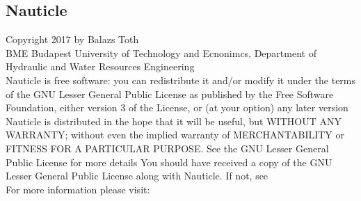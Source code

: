 \documentclass[a4paper,12pt,openany]{book}
\newcommand{\myhref}[3][nauticlegreen_dark]{\href{#2}{\color{#1}{#3}}}%
\theoremstyle{break}
\begin{document}
\subsection{Nauticle}
\noindent
Copyright \textcopyright{} 2017 by Balazs Toth \\
\noindent
BME Budapest University of Technology and Ecnonimcs, Department of Hydraulic and Water Resources Engineering\\

Nauticle is free software: you can redistribute it and/or modify it under the terms of the GNU Lesser General Public License as published by the Free Software Foundation, either version 3 of the License, or (at your option) any later version Nauticle is distributed in the hope that it will be useful, but WITHOUT ANY WARRANTY; without even the implied warranty of MERCHANTABILITY or FITNESS FOR A PARTICULAR PURPOSE.  See the GNU Lesser General Public License for more details You should have received a copy of the GNU Lesser General Public License along with Nauticle.  If not, see \myhref{http://www.gnu.org/licenses/}{http://www.gnu.org/licenses/}\\
 For more information please visit: \myhref{https://bitbucket.org/Nauticleproject/}{https://bitbucket.org/Nauticleproject/}
\end{document}
